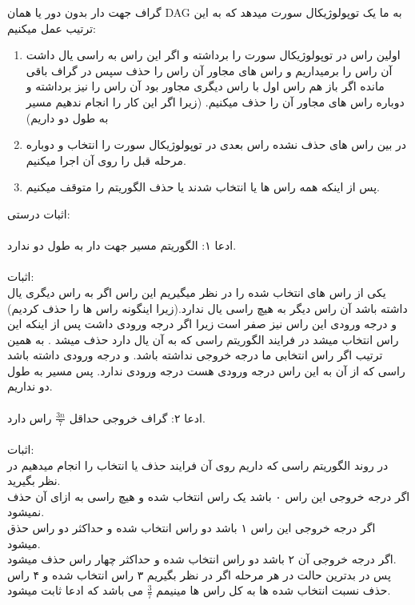 \problem{}
گراف جهت دار بدون دور یا همان DAG به ما یک
توپولوژیکال سورت میدهد
که به این ترتیب عمل میکنیم:\\
\begin{enumerate}
    \item 
    اولین راس در توپولوژیکال سورت
    را برداشته و اگر این راس به راسی یال داشت
    آن راس را برمیداریم و راس های مجاور آن راس را حذف
    سپس در گراف باقی مانده اگر باز هم
    راس اول با راس دیگری مجاور بود آن راس را نیز برداشته و دوباره
    راس های مجاور آن را حذف میکنیم.
    (زیرا اگر این کار را انجام ندهیم مسیر به طول دو داریم)
    \item
    در بین راس های حذف نشده راس بعدی در توپولوژیکال سورت
    را انتخاب و دوباره مرحله قبل را روی آن اجرا میکنیم.
    \item
    پس از اینکه همه راس ها یا انتخاب شدند یا حذف الگوریتم را متوقف میکنیم.
\end{enumerate}

اثبات درستی:\\\\
ادعا ۱:
الگوریتم مسیر جهت دار به طول دو ندارد.\\\\
اثبات:\\
یکی از راس های انتخاب شده را در نظر میگیریم این راس اگر به راس دیگری یال داشته باشد
آن راس دیگر به هیچ راسی یال ندارد.(زیرا اینگونه راس ها را حذف کردیم)
و درجه ورودی این راس نیز صفر است زیرا اگر درجه ورودی داشت پس از اینکه این راس انتخاب میشد
در فرایند الگوریتم راسی که به آن یال دارد حذف میشد . به همین ترتیب اگر 
راس انتخابی ما درجه خروجی نداشته باشد.
و درجه ورودی داشته باشد راسی که از آن به این راس درجه ورودی هست
درجه ورودی ندارد.
پس مسیر به طول دو نداریم.\\\\
ادعا ۲:
گراف خروجی حداقل $\frac{3n}{7}$ راس دارد.\\\\
اثبات:\\
در روند الگوریتم راسی که داریم روی آن فرایند
حذف یا انتخاب را انجام میدهیم در نظر بگیرید.\\
اگر درجه خروجی این راس ۰ باشد یک راس انتخاب شده و هیچ راسی به ازای آن حذف نمیشود.\\
اگر درجه خروجی این راس ۱ باشد دو راس انتخاب شده و حداکثر دو راس حذق میشود.\\
اگر درجه خروجی آن ۲ باشد دو راس انتخاب شده و حداکثر چهار راس حذف میشود.\\
پس در بدترین حالت در هر مرحله اگر در نظر بگیریم ۳ راس انتخاب شده و ۴ راس حذف
نسبت انتخاب شده ها به کل راس ها مینیمم $\frac{3}{7}$
می باشد که ادعا ثابت میشود.